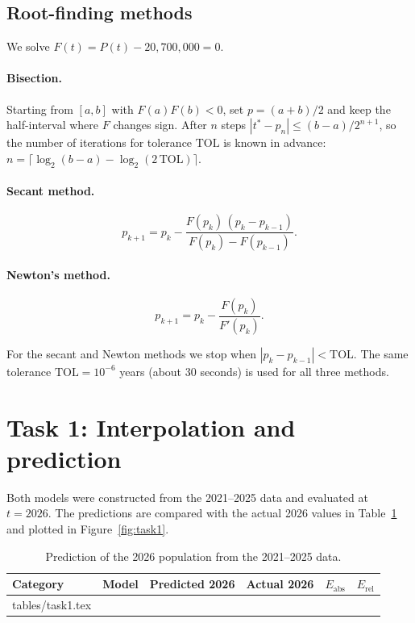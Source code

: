 \documentclass[11pt,a4paper]{article}
\makeatletter
\newcommand{\tabinput}[1]{\@@input #1 }
\makeatother
\begin{document}
\subsection{Root-finding methods}
We solve $F(t)=P(t)-20{,}700{,}000=0$.

\paragraph{Bisection.} Starting from $[a,b]$ with $F(a)F(b)<0$, set
$p=(a+b)/2$ and keep the half-interval where $F$ changes sign. After $n$ steps
$|t^*-p_n|\le (b-a)/2^{n+1}$, so the number of iterations for tolerance
$\mathrm{TOL}$ is known in advance:
$n=\lceil \log_2(b-a)-\log_2(2\,\mathrm{TOL})\rceil$.

\paragraph{Secant method.}
\begin{equation}
p_{k+1} = p_k - \frac{F(p_k)\,(p_k-p_{k-1})}{F(p_k)-F(p_{k-1})}.
\end{equation}

\paragraph{Newton's method.}
\begin{equation}
p_{k+1} = p_k - \frac{F(p_k)}{F'(p_k)}.
\end{equation}

For the secant and Newton methods we stop when $|p_k-p_{k-1}|<\mathrm{TOL}$.
The same tolerance $\mathrm{TOL}=10^{-6}$ years (about 30 seconds) is used for all
three methods.

\section{Task 1: Interpolation and prediction}
Both models were constructed from the 2021--2025 data and evaluated at $t=2026$.
The predictions are compared with the actual 2026 values in Table~\ref{tab:task1}
and plotted in Figure~\ref{fig:task1}.

\begin{table}[H]
\centering
\caption{Prediction of the 2026 population from the 2021--2025 data.}
\label{tab:task1}
\begin{tabular}{llrrrr}
\toprule
Category & Model & Predicted 2026 & Actual 2026 & $E_{\text{abs}}$ & $E_{\text{rel}}$ \\
\midrule
\tabinput{tables/task1.tex}
\bottomrule
\end{tabular}
\end{table}
\end{document}

